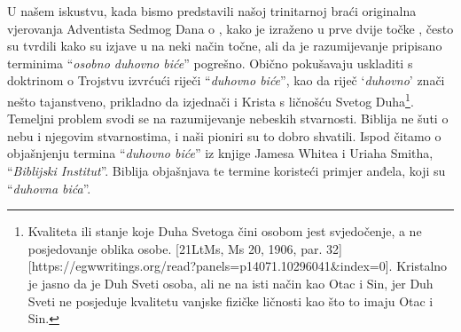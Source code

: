 U našem iskustvu, kada bismo predstavili našoj trinitarnoj braći originalna vjerovanja Adventista Sedmog Dana o , kako je izraženo u prve dvije točke , često su tvrdili kako su izjave u  na neki način točne, ali da je razumijevanje pripisano terminima “\textit{osobno duhovno biće}” pogrešno. Obično pokušavaju uskladiti  s doktrinom o Trojstvu izvrćući riječi “\textit{duhovno biće}”, kao da riječ ‘\textit{duhovno}’ znači nešto tajanstveno, prikladno da izjednači  i Krista s ličnošću Svetog Duha\footnote{Kvaliteta ili stanje koje Duha Svetoga čini osobom jest svjedočenje, a ne posjedovanje oblika osobe. [21LtMs, Ms 20, 1906, par. 32][https://egwwritings.org/read?panels=p14071.10296041&index=0]. Kristalno je jasno da je Duh Sveti osoba, ali ne na isti način kao Otac i Sin, jer Duh Sveti ne posjeduje kvalitetu vanjske fizičke ličnosti kao što to imaju Otac i Sin.}. Temeljni problem svodi se na razumijevanje nebeskih stvarnosti. Biblija ne šuti o nebu i njegovim stvarnostima, i naši pioniri su to dobro shvatili. Ispod čitamo o objašnjenju termina “\textit{duhovno biće}” iz knjige Jamesa Whitea i Uriaha Smitha, “\textit{Biblijski Institut}”. Biblija objašnjava te termine koristeći primjer anđela, koji su “\textit{duhovna bića}”.

